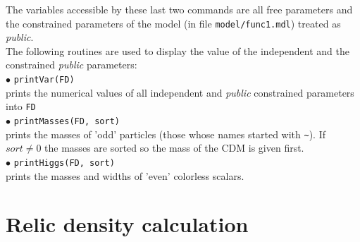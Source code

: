 \documentclass[12pt,a4paper]{article}
\begin{document}
\noindent
The variables accessible by these last two commands are all free parameters and   the 
constrained parameters of the model (in file \verb|model/func1.mdl|)
treated as {\it public}. \\


The following routines are used to display the value of the independent and the constrained 
{\it public} parameters:\\[2mm]
% 
$\bullet$ \verb|printVar(FD)|\\ 
prints the numerical values of all independent and {\it public} 
constrained parameters into \verb|FD|\\[2mm]
%
$\bullet$ \verb|printMasses(FD, sort)|\\
 prints the masses of 'odd' particles
(those whose names  started with \verb|~|). If $sort\ne 0$
the masses are sorted so the mass of the CDM is given first.\\[2mm]
%
$\bullet$ \verb|printHiggs(FD, sort)|\\
prints the masses and widths of 'even' colorless scalars.


\section{Relic density calculation}
\end{document}
